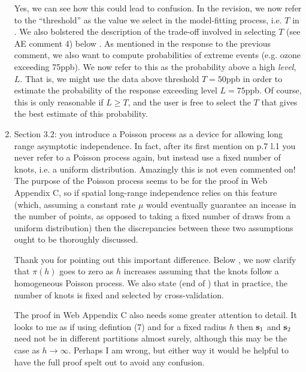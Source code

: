 \documentclass[11pt]{article}
\begin{document}
\begin{enumerate}[1.]
  \begin{response}
    Yes, we can see how this could lead to confusion.
    In the revision, we now refer to the ``threshold'' as the value we select in the model-fitting process, i.e. $T$ in .
    We also bolstered the description of the trade-off involved in selecting $T$ (see AE comment 4) below .
    As mentioned in the response to the previous comment, we also want to compute probabilities of extreme events (e.g. ozone exceeding 75ppb).
    We now refer to this as the probability above a high \emph{level}, $L$.
    That is, we might use the data above threshold $T = 50$ppb in order to estimate the probability of the response exceeding level $L = 75$ppb.
    Of course, this is only reasonable if $L \ge T$, and the user is free to select the $T$ that gives the best estimate of this probability.
  \end{response}

  \item Section 3.2: you introduce a Poisson process as a device for allowing long range asymptotic independence. In fact, after its first mention on p.7 l.1 you never refer to a Poisson process again, but instead use a fixed number of knots, i.e. a uniform distribution. Amazingly this is not even commented on! The purpose of the Poisson process seems to be for the proof in Web Appendix C, so if spatial long-range independence relies on this feature (which, assuming a constant rate $\mu$ would eventually guarantee an incease in the number of points, as opposed to taking a fixed number of draws from a uniform distribution) then the discrepancies between these two assumptions ought to be thoroughly discussed. \\

  \begin{response}
    Thank you for pointing out this important difference.
    Below , we now clarify that $\pi(h)$ goes to zero as $h$ increases assuming that the knots follow a homogeneous Poisson process.
    We also state (end of ) that in practice, the number of knots is fixed and selected by cross-validation.
  \end{response}

  The proof in Web Appendix C also needs some greater attention to detail. It looks to me as if using defintion (7) and for a fixed radius $h$ then $\mbox{\bf s}_1$ and $\mbox{\bf s}_2$ need not be in different partitions almost surely, although this may be the case as $h \rightarrow \infty$. Perhaps I am wrong, but either way it would be helpful to have the full proof spelt out to avoid any confusion. \\


\end{enumerate}
\end{document}
